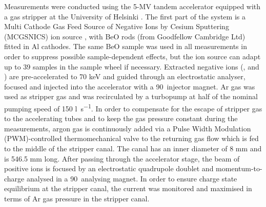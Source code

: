 \documentclass[a4paper,fleqn,review]{cas-sc}
\begin{document}
Measurements were conducted using the 5-MV tandem accelerator equipped with a gas stripper at the University of Helsinki \cite{gonsalves2020charge}. The first part of the system is a Multi Cathode Gas Feed Source of Negative Ions by Cesium Sputtering (MCGSNICS) ion source \cite{tikkanen2004ams}, with BeO rods (from Goodfellow Cambridge Ltd) fitted in Al cathodes. The same BeO sample was used in all measurements in order to suppress possible sample-dependent effects, but the ion source can adapt up to 39 samples in the sample wheel if necessary. Extracted negative ions (,  and ) are pre-accelerated to 70 keV and guided through an electrostatic analyser, focused and injected into the accelerator with a 90\degree\ injector magnet. Ar gas was used as stripper gas and was recirculated by a turbopump at half of the nominal pumping speed of 150 \si{\litre\per\second}. In order to compensate for the escape of stripper gas to the accelerating tubes and to keep the gas pressure constant during the measurements, argon gas is continuously added via a Pulse Width Modulation (PWM)-controlled thermomechanical valve to the returning gas flow which is fed to the middle of the stripper canal. The canal has an inner diameter of 8 mm and is 546.5 mm long.  After passing through the accelerator stage, the beam of positive ions is focused by an electrostatic quadrupole doublet and momentum-to-charge analysed in a 90\degree\ analysing magnet. In order to ensure charge state equilibrium at the stripper canal, the  current was monitored and maximised in terms of Ar gas pressure in the stripper canal.
\end{document}
